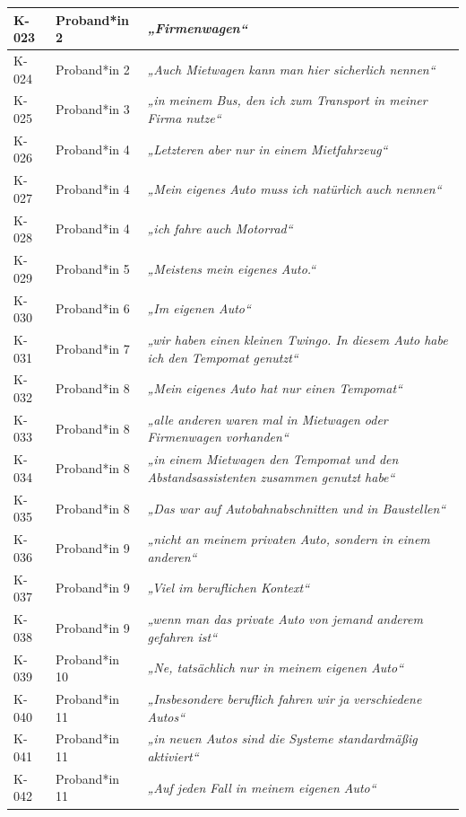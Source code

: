 {\begin{xltabular}{\textwidth}{
    |P{0.10\textwidth}
    |P{0.17\textwidth}
    |Y|
}
K-023 & Proband*in 2 & \textit{„Firmenwagen“} \\
\hline
K-024 & Proband*in 2 & \textit{„Auch Mietwagen kann man hier sicherlich nennen“} \\
\hline
K-025 & Proband*in 3 & \textit{„in meinem Bus, den ich zum Transport in meiner Firma nutze“} \\
\hline
K-026 & Proband*in 4 & \textit{„Letzteren aber nur in einem Mietfahrzeug“} \\
\hline
K-027 & Proband*in 4 & \textit{„Mein eigenes Auto muss ich natürlich auch nennen“} \\
\hline
K-028 & Proband*in 4 & \textit{„ich fahre auch Motorrad“} \\
\hline
K-029 & Proband*in 5 & \textit{„Meistens mein eigenes Auto.“} \\
\hline
K-030 & Proband*in 6 & \textit{„Im eigenen Auto“} \\
\hline
K-031 & Proband*in 7 & \textit{„wir haben einen kleinen Twingo. In diesem Auto habe ich den Tempomat genutzt“} \\
\hline
K-032 & Proband*in 8 & \textit{„Mein eigenes Auto hat nur einen Tempomat“} \\
\hline
K-033 & Proband*in 8 & \textit{„alle anderen waren mal in Mietwagen oder Firmenwagen vorhanden“} \\
\hline
K-034 & Proband*in 8 & \textit{„in einem Mietwagen den Tempomat und den Abstandsassistenten zusammen genutzt habe“} \\
\hline
K-035 & Proband*in 8 & \textit{„Das war auf Autobahnabschnitten und in Baustellen“} \\
\hline
K-036 & Proband*in 9 & \textit{„nicht an meinem privaten Auto, sondern in einem anderen“} \\
\hline
K-037 & Proband*in 9 & \textit{„Viel im beruflichen Kontext“} \\
\hline
K-038 & Proband*in 9 & \textit{„wenn man das private Auto von jemand anderem gefahren ist“} \\
\hline
K-039 & Proband*in 10 & \textit{„Ne, tatsächlich nur in meinem eigenen Auto“} \\
\hline
K-040 & Proband*in 11 & \textit{„Insbesondere beruflich fahren wir ja verschiedene Autos“} \\
\hline
K-041 & Proband*in 11 & \textit{„in neuen Autos sind die Systeme standardmäßig aktiviert“} \\
\hline
K-042 & Proband*in 11 & \textit{„Auf jeden Fall in meinem eigenen Auto“} \\

\end{xltabular}}
